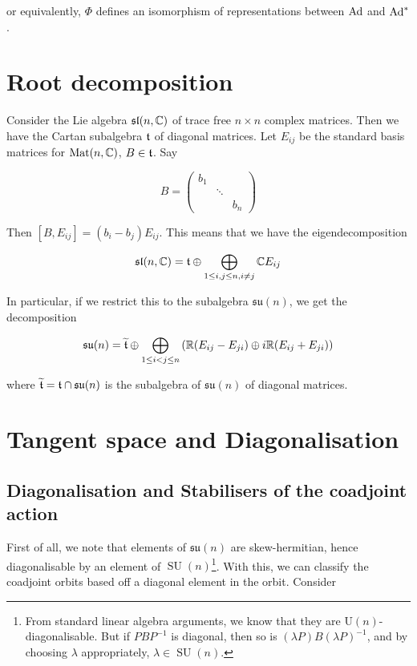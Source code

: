 \documentclass{article}
\DeclareMathOperator{\SU}{SU}
\newcommand{\su}{\mathfrak{su}}
\renewcommand{\sl}{\mathfrak{sl}}
\renewcommand{\tilde}{\widetilde}
\begin{document}
or equivalently, \(\Phi\) defines an isomorphism of representations between \(\operatorname{Ad}\) and \(\operatorname{Ad}^*\).

\section{Root decomposition}

Consider the Lie algebra \(\sl(n, \C)\) of trace free \(n \times n\) complex matrices. Then we have the Cartan subalgebra \(\mathfrak{t}\) of diagonal matrices. Let \(E_{ij}\) be the standard basis matrices for \(\operatorname{Mat}(n, \mathbb{C})\), \(B \in \mathfrak{t}\). Say

\[B = \begin{pmatrix}
    b_1 \\
    & \ddots \\
    & & b_n
\end{pmatrix}\]

Then \([B, E_{ij}] = (b_i - b_j)E_{ij}\). This means that we have the eigendecomposition

\begin{equation}
    \label{eq:sln-root}
    \sl(n, \C) = \mft \oplus \bigoplus_{1 \le i, j \le n, i \ne j} \C E_{ij}
\end{equation}

In particular, if we restrict this to the subalgebra \(\su(n)\), we get the decomposition

\begin{equation}
    \label{eq:sun-root}
    \su(n) = \tilde\mft \oplus \bigoplus_{1 \le i < j \le n} \left(\R(E_{ij} - E_{ji}) \oplus i\R (E_{ij} + E_{ji})\right)
\end{equation}

where \(\tilde \mft = \mft \cap \su(n)\) is the subalgebra of \(\su(n)\) of diagonal matrices. 

\section{Tangent space and Diagonalisation}

\label{sec:tangent}

\subsection{Diagonalisation and Stabilisers of the coadjoint action}

First of all, we note that elements of \(\su(n)\) are skew-hermitian, hence diagonalisable by an element of \(\SU(n)\)\footnote{From standard linear algebra arguments, we know that they are \(\mathrm U(n)\)-diagonalisable. But if \(PBP^{-1}\) is diagonal, then so is \((\lambda P)B(\lambda P)^{-1}\), and by choosing \(\lambda\) appropriately, \(\lambda \in \SU(n)\).}. With this, we can classify the coadjoint orbits based off a diagonal element in the orbit. Consider
\end{document}
